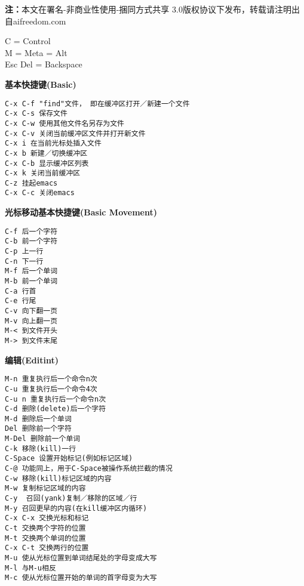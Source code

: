 \documentclass{article}
\newcommand{\hei}{\CJKfamily{hei}}         %
\newcommand{\sihao}{\fontsize{14pt}{21pt}\selectfont}            %
\newcommand{\xiaosi}{\fontsize{12pt}{18pt}\selectfont}            %
\begin{document}
\begin{center}
\hei\sihao{Emacs快捷键列表}
\end{center}
\noindent \textbf{注：}本文在署名-非商业性使用-捆同方式共享  3.0版权协议下发布，转载请注明出自aifreedom.com

\begin{multicols}{2}

\noindent C = Control \\
M = Meta = Alt  \\
Esc Del = Backspace 

\noindent \textbf{\xiaosi 基本快捷键(Basic)}
\vspace{-9pt} 
\begin{verbatim}
C-x C-f "find"文件， 即在缓冲区打开／新建一个文件
C-x C-s 保存文件
C-x C-w 使用其他文件名另存为文件
C-x C-v 关闭当前缓冲区文件并打开新文件
C-x i 在当前光标处插入文件
C-x b 新建／切换缓冲区 
C-x C-b 显示缓冲区列表 
C-x k 关闭当前缓冲区
C-z 挂起emacs
C-x C-c 关闭emacs
\end{verbatim}
\vspace{-9pt}
\noindent \textbf{\xiaosi 光标移动基本快捷键(Basic Movement)}
\vspace{-9pt} 
\begin{verbatim}
C-f 后一个字符 
C-b 前一个字符 
C-p 上一行
C-n 下一行
M-f 后一个单词 
M-b 前一个单词 
C-a 行首
C-e 行尾
C-v 向下翻一页 
M-v 向上翻一页 
M-< 到文件开头 
M-> 到文件末尾
\end{verbatim}
\vspace{-9pt}
\noindent \textbf{\xiaosi 编辑(Editint)}
\vspace{-9pt} 
\begin{verbatim}
M-n 重复执行后一个命令n次
C-u 重复执行后一个命令4次
C-u n 重复执行后一个命令n次
C-d 删除(delete)后一个字符
M-d 删除后一个单词
Del 删除前一个字符
M-Del 删除前一个单词
C-k 移除(kill)一行
C-Space 设置开始标记(例如标记区域)
C-@ 功能同上，用于C-Space被操作系统拦截的情况
C-w 移除(kill)标记区域的内容
M-w 复制标记区域的内容
C-y  召回(yank)复制／移除的区域／行
M-y 召回更早的内容(在kill缓冲区内循环)
C-x C-x 交换光标和标记
C-t 交换两个字符的位置 
M-t 交换两个单词的位置 
C-x C-t 交换两行的位置
M-u 使从光标位置到单词结尾处的字母变成大写
M-l 与M-u相反
M-c 使从光标位置开始的单词的首字母变为大写
\end{verbatim}

\end{multicols}
\end{document}
